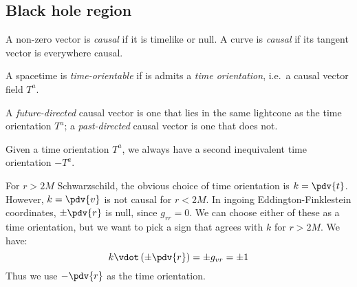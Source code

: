 \documentclass{jknotes}
\begin{document}
\subsection{Black hole region}
\begin{defn}
    A non-zero vector is \emph{causal} if it is timelike or null. A curve is \emph{causal} if its tangent vector is everywhere causal. 
\end{defn}
\begin{defn}
    A spacetime is \emph{time-orientable} if is admits a \emph{time orientation}, i.e.\ a causal vector field \(T^a\).
\end{defn}
\begin{defn}
    A \emph{future-directed} causal vector is one that lies in the same lightcone as the time orientation \(T^a\); a \emph{past-directed} causal vector is one that does not.
\end{defn}
Given a time orientation \(T^a\), we always have a second inequivalent time orientation \(-T^a\).

For \(r>2M\) Schwarzschild, the obvious choice of time orientation is \(k=\pdv{t}\). However, \(k=\pdv{v}\) is not causal for \(r<2M\). In ingoing Eddington-Finklestein coordinates, \(\pm\pdv{r}\) is null, since \(g_{rr} = 0\). We can choose either of these as a time orientation, but we want to pick a sign that agrees with \(k\) for \(r>2M\). We have:
\begin{equation}
    k\vdot\left( \pm \pdv{r} \right) = \pm g_{vr} = \pm 1
\end{equation}
Thus we use \(-\pdv{r}\) as the time orientation.
\end{document}
